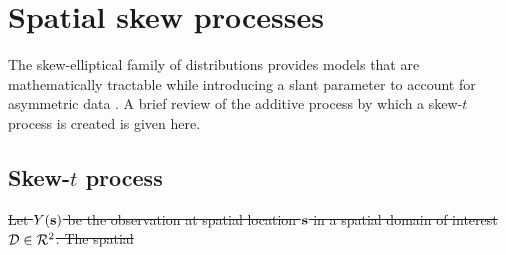 \documentclass[useAMS,usenatbib,referee]{biom}
\providecommand{\DIFdel}[1]{{\protect\color{red}\sout{#1}}}                      %
\providecommand{\DIFaddbegin}{} %
\providecommand{\DIFdelbegin}{} %
\providecommand{\DIFdelend}{} %
\begin{document}

\section{Spatial skew processes}\label{s:spatialskew}
The skew-elliptical family of distributions provides models that are mathematically tractable while introducing a slant parameter to account for asymmetric data \citep{Azzalini2014}.
A brief review of the additive process by which a skew-$t$ process is created is given here.

\subsection{Skew-$t$ process} \label{s:skewt}
\DIFdelbegin \DIFdel{Let $Y(\mbox{\bf s})$ be the observation at spatial location $\mbox{\bf s}$ in a spatial domain of interest $\calD \in \calR^2$.
The spatial }\DIFdelend %
\DIFaddbegin 
\end{document}
